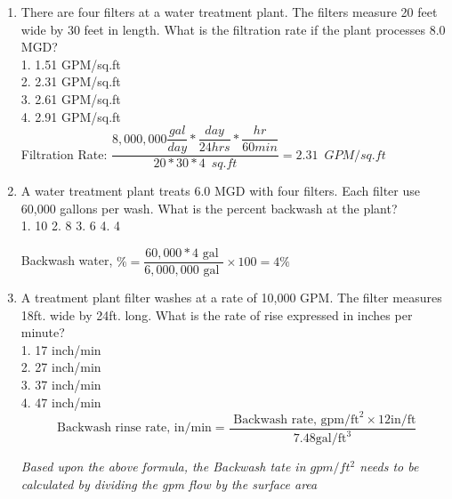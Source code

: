 \documentclass{article}
\begin{document}
\begin{enumerate}

\item There are four filters at a water treatment plant. The filters measure 20 feet wide by 30 feet in length. What is the filtration rate if the plant processes 8.0 MGD?\\
1.	1.51 GPM/sq.ft\\
2.	2.31 GPM/sq.ft\\
3.	2.61 GPM/sq.ft\\
4.	2.91 GPM/sq.ft\\

Filtration Rate:  $ \dfrac{8,000,000\dfrac{gal}{day}*\dfrac{day}{24hrs}*\dfrac{hr}{60min}}{20*30*4 \enspace sq.ft} = \boxed{2.31 \enspace GPM/sq.ft}$

\item A water treatment plant treats 6.0 MGD with four filters. Each filter use 60,000 gallons per wash. What is the percent backwash at the plant?\\
1.	10%
2.	8%
3.	6%
4.	4%

Backwash water, $\%=\dfrac{60,000*4 \text { gal }}{6,000,000 \text { gal }} \times 100 = \boxed{4 \%}$
\item A treatment plant filter washes at a rate of 10,000 GPM. The filter measures 18ft. wide by 24ft. long. What is the rate of rise expressed in inches per minute?\\
1.	17 inch/min\\
2.	27 inch/min\\
3.	37 inch/min\\
4.	47 inch/min\\

$$\text{ Backwash rinse rate, in/} \mathrm{min}=\frac{\text { Backwash rate, } \mathrm{gpm} / \mathrm{ft}^{2} \times 12 \mathrm{in} / \mathrm{ft}}{7.48 \mathrm{gal} / \mathrm{ft}^{3}}$$

\textit{Based upon the above formula, the Backwash tate in $gpm/ft^2$ needs to be calculated by dividing the gpm flow by the surface area}


\end{enumerate}
\end{document}
